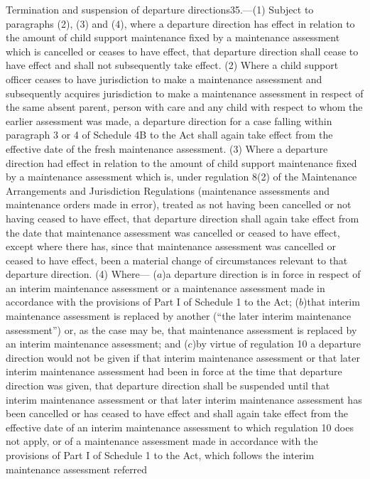\documentclass[a4paper]{article}
\begin{document}
Termination and suspension of departure directions35.—(1) Subject to paragraphs
(2), (3) and (4), where a departure direction has effect in relation to the
amount of child support maintenance fixed by a maintenance assessment which is
cancelled or ceases to have effect, that departure direction shall cease to have
effect and shall not subsequently take effect.
(2) Where a child support officer ceases to have jurisdiction to make a
maintenance assessment and subsequently acquires jurisdiction to make a
maintenance assessment in respect of the same absent parent, person with care
and any child with respect to whom the earlier assessment was made, a departure
direction for a case falling within paragraph 3 or 4 of Schedule 4B to the Act
shall again take effect from the effective date of the fresh maintenance
assessment.
(3) Where a departure direction had effect in relation to the amount of child
support maintenance fixed by a maintenance assessment which is, under regulation
8(2) of the Maintenance Arrangements and Jurisdiction Regulations (maintenance
assessments and maintenance orders made in error), treated as not having been
cancelled or not having ceased to have effect, that departure direction shall
again take effect from the date that maintenance assessment was cancelled or
ceased to have effect, except where there has, since that maintenance assessment
was cancelled or ceased to have effect, been a material change of circumstances
relevant to that departure direction.
(4) Where—
($a$)a departure direction is in force in respect of an interim maintenance
assessment or a maintenance assessment made in accordance with the provisions of
Part I of Schedule 1 to the Act;
($b$)that interim maintenance assessment is replaced by another (“the later
interim maintenance assessment”) or, as the case may be, that maintenance
assessment is replaced by an interim maintenance assessment; and
($c$)by virtue of regulation 10 a departure direction would not be given if that
interim maintenance assessment or that later interim maintenance assessment had
been in force at the time that departure direction was given, that departure
direction shall be suspended until that interim maintenance assessment or that
later interim maintenance assessment has been cancelled or has ceased to have
effect and shall again take effect from the effective date of an interim
maintenance assessment to which regulation 10 does not apply, or of a
maintenance assessment made in accordance with the provisions of Part I of
Schedule 1 to the Act, which follows the interim maintenance assessment referred
\end{document}
